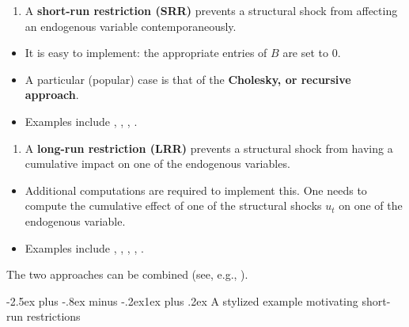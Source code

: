 \documentclass[
  11pt,
]{book}
\makeatletter
\providecommand{\tightlist}{%
  \setlength{\itemsep}{0pt}\setlength{\parskip}{0pt}}
\renewcommand\subsection{\@startsection{subsection}{2}{\z@}
  {-2.5ex plus -.8ex minus -.2ex}{1ex plus .2ex}
  {\normalfont\large\bfseries\color{TextbookInk}}}
\theoremstyle{definition}
\theoremstyle{definition}
\theoremstyle{definition}
\theoremstyle{definition}
\theoremstyle{remark}
\makeatother
\begin{document}
\begin{enumerate}
\def\labelenumi{\arabic{enumi}.}
\tightlist
\item
  A \textbf{short-run restriction (SRR)} prevents a structural shock from affecting an endogenous variable contemporaneously.
\end{enumerate}

\begin{itemize}
\tightlist
\item
  It is easy to implement: the appropriate entries of \(B\) are set to 0.
\item
  A particular (popular) case is that of the \textbf{Cholesky, or recursive approach}.
\item
  Examples include \citet{BERNANKE198649}, \citet{Sims_1986}, \citet{Gali_1992}, \citet{RubioRamirez_et_al_2010}.
\end{itemize}

\begin{enumerate}
\def\labelenumi{\arabic{enumi}.}
\setcounter{enumi}{1}
\tightlist
\item
  A \textbf{long-run restriction (LRR)} prevents a structural shock from having a cumulative impact on one of the endogenous variables.
\end{enumerate}

\begin{itemize}
\tightlist
\item
  Additional computations are required to implement this. One needs to compute the cumulative effect of one of the structural shocks \(u_{t}\) on one of the endogenous variable.
\item
  Examples include \citet{Blanchard_Quah_1989}, \citet{Faust_Leeper_1997}, \citet{Gali_1999}, \citet{Erceg_et_al_2005}, \citet{NBERc11177}.
\end{itemize}

The two approaches can be combined (see, e.g., \citet{Gerlach_Smets_1995}).

\subsection{A stylized example motivating short-run restrictions}\label{a-stylized-example-motivating-short-run-restrictions}
\end{document}

